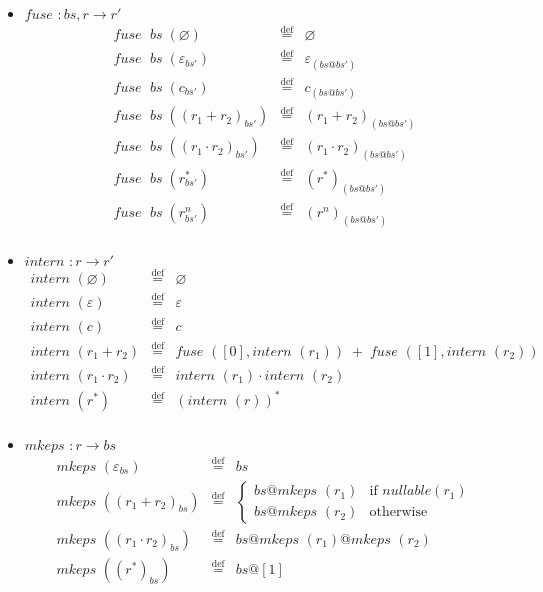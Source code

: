 \documentclass[12pt]{article}
\newcommand{\fuse}{\textit{fuse }}
\newcommand{\mkeps}{\textit{mkeps }}
\newcommand{\intern}{\textit{intern }}
\newcommand{\nullable}{\textit{nullable}}
\begin{document}
\begin{itemize}
\item $\fuse : bs, r \to r'$
  \[
  \begin{array}{rcl}
  \fuse\; bs\; (\varnothing)           & \stackrel{\text{def}}{=} & \varnothing \\
  \fuse\; bs\; (\varepsilon_{bs'})     & \stackrel{\text{def}}{=} & \varepsilon_{(bs @ bs')} \\
  \fuse\; bs\; (c_{bs'})               & \stackrel{\text{def}}{=} & c_{(bs @ bs')} \\
  \fuse\; bs\; ((r_1 + r_2)_{bs'} )      & \stackrel{\text{def}}{=} & (r_1 + r_2)_{(bs @ bs')} \\
  \fuse\; bs\; ((r_1 \cdot r_2)_{{bs'}})   & \stackrel{\text{def}}{=} & (r_1 \cdot r_2)_{(bs @ bs')} \\
  \fuse\; bs\; (r^*_{bs'})             & \stackrel{\text{def}}{=} & (r^*)_{(bs @ bs')} \\
  \fuse\; bs\; (r^n_{bs'})             & \stackrel{\text{def}}{=} & (r^n)_{(bs @ bs')} \\
  \end{array}
  \]

  \item $\intern : r \to r'$
    \[
    \begin{array}{rcl}
    \intern(\varnothing)     & \stackrel{\text{def}}{=} & \varnothing \\
    \intern(\varepsilon)     & \stackrel{\text{def}}{=} & \varepsilon \\
    \intern(c)               & \stackrel{\text{def}}{=} & c \\
    \intern(r_1 + r_2)       & \stackrel{\text{def}}{=} & \fuse([0], \intern(r_1)) \;+\; \fuse([1], \intern(r_2)) \\
    \intern(r_1 \cdot r_2)   & \stackrel{\text{def}}{=} & \intern(r_1) \cdot \intern(r_2) \\
    \intern(r^*)             & \stackrel{\text{def}}{=} & (\intern(r))^* \\
    \end{array}
    \]

  \item $\mkeps : r \to bs$
  \[
  \begin{array}{rcl}
  \mkeps(\varepsilon_{bs})            & \stackrel{\text{def}}{=} & bs \\
  \mkeps((r_1 + r_2)_{bs})            & \stackrel{\text{def}}{=} & 
       \begin{cases}
         bs @ \mkeps(r_1) & \text{if }\nullable(r_1) \\
         bs @ \mkeps(r_2) & \text{otherwise}
       \end{cases} \\
  \mkeps((r_1 \cdot r_2)_{bs})        & \stackrel{\text{def}}{=} & bs @ \mkeps(r_1) @ \mkeps(r_2) \\
  \mkeps((r^*)_{bs})                  & \stackrel{\text{def}}{=} & bs @ [1] \\
  \end{array}
  \]


\end{itemize}
\end{document}
